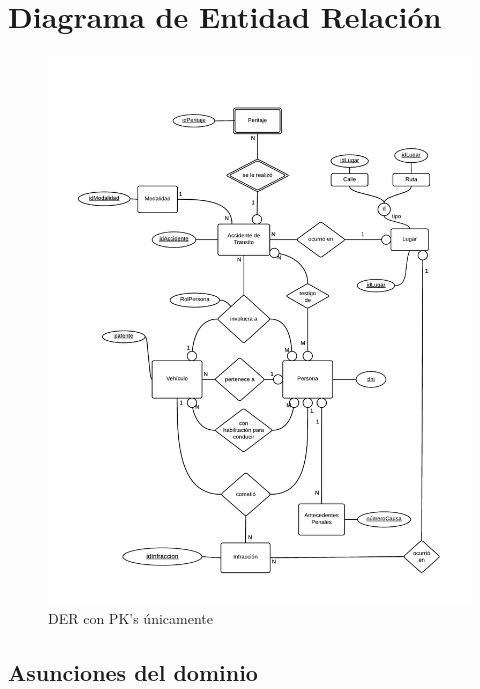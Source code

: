 \section{Diagrama de Entidad Relación}

\begin{figure}
  \begin{center}
    \includegraphics[scale=0.70]{diagramas/1.pdf}
    \caption{DER con PK's únicamente}
  \end{center}
\end{figure}

\subsection{Asunciones del dominio}

